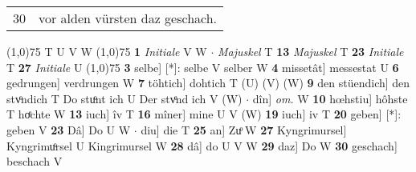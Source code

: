 \documentclass[8pt,a4paper,notitlepage]{article}
\begin{document}
\begin{table}[ht]
\begin{minipage}[t]{0.5\linewidth}
\begin{tabular}{rl}
30 & vor alden vürsten daz geschach.\\ 
\end{tabular}
\scriptsize
\line(1,0){75} \newline
T U V W \newline
\line(1,0){75} \newline
\textbf{1} \textit{Initiale} V W   $\cdot$ \textit{Majuskel} T  \textbf{13} \textit{Majuskel} T  \textbf{23} \textit{Initiale} T  \textbf{27} \textit{Initiale} U  \newline
\line(1,0){75} \newline
\textbf{3} selbe] [*]: selbe V selber W \textbf{4} missetât] messestat U \textbf{6} gedrungen] verdrungen W \textbf{7} töhtich] dohtich T (U) (V) (W) \textbf{9} den stüendich] den stvͦndich T Do stuͦnt ich U Der stvͤnd ich V (W)  $\cdot$ dîn] \textit{om.} W \textbf{10} hœhstiu] hôhste T hoͤchte W \textbf{13} iuch] îv T \textbf{16} mîner] mine U V (W) \textbf{19} iuch] iv T \textbf{20} geben] [*]: geben V \textbf{23} Dâ] Do U W  $\cdot$ diu] die T \textbf{25} an] Zuͦ W \textbf{27} Kyngrimursel] Kyngrimuͦrsel U Kingrimursel W \textbf{28} dâ] do U V W \textbf{29} daz] Do W \textbf{30} geschach] beschach V \newline
\end{minipage}
\end{table}
\end{document}
